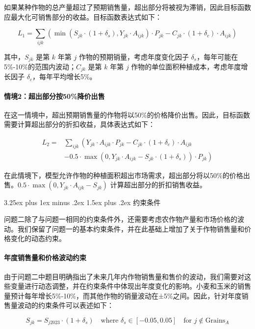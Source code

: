 \documentclass[12pt,a4paper]{nmmcm}
\makeatletter
\renewcommand\subsection{\@startsection{subsection}{2}{0pt}%
    {3.25ex plus 1ex minus .2ex}%
    {1.5ex plus .2ex}%
    {\normalfont\Large\bfseries}}
\makeatother
\begin{document}
如果某种作物的总产量超过了预期销售量，超出部分将被视为滞销，因此目标函数应最大化可销售部分的收益。目标函数表达式如下：

\[
  L_1 = \sum_{ijk} \left( \min(S_{jk} \cdot (1 + \delta_s), Y_{jk} \cdot A_{ijk}) \cdot P_{jk} - C_{jk} \cdot (1 + \delta_c) \cdot A_{ijk} \right)
\]

其中，$S_{jk}$ 是第 $k$ 年第 $j$ 作物的预期销量，考虑年度变化因子 $\delta_s$，每年可能在5\%-10\%的范围内波动；$C_{jk}$ 是第 $k$ 年第 $j$ 作物的单位面积种植成本，考虑年度增长因子 $\delta_c$，每年平均增长5\%。

\paragraph{情境2：超出部分按50\%降价出售}

在这一情境中，超出预期销售量的作物将以50\%的价格降价出售。因此，目标函数需要计算超出部分的折扣收益，具体表达式如下：

\begin{align*}
  L_2 = & \sum_{ijk} \left( Y_{jk} \cdot A_{ijk} \cdot P_{jk}
  - C_{jk} \cdot (1 + \delta_c) \cdot A_{ijk} \right.           \\
        & \left. - 0.5 \cdot \max\left( 0, Y_{jk} \cdot A_{ijk}
  - S_{jk} \cdot (1 + \delta_s) \right) \cdot P_{jk} \right)
\end{align*}


在此情境下，模型允许作物的种植面积超出市场需求，超出部分将以50\%的价格出售。$0.5 \cdot \max(0, Y_{jk} \cdot A_{ijk} - S_{jk})$ 计算超出部分的折扣销售收益。

\subsection{约束条件}

问题二除了与问题一相同的约束条件外，还需要考虑农作物产量和市场价格的波动。我们保留了问题一的基本约束条件，并在此基础上增加了关于作物销售量和价格变化的动态约束。

\paragraph{年度销售量和价格波动约束}

由于问题二中题目明确指出了未来几年内作物销售量和售价的波动，我们需要对这些变量进行动态调整，并在约束条件中体现出年度变化的影响。小麦和玉米的销售量预计每年增长5\%-10\%，而其他作物的销量波动在±5\%之间。因此，针对年度销售量波动的约束条件可以表述如下：

\[
  S_{jk} = S_{j2023} \cdot (1 + \delta_s) \quad \text{where } \delta_s \in [-0.05, 0.05] \quad \text{for } j \notin \text{Grains}_A
\]
\end{document}
